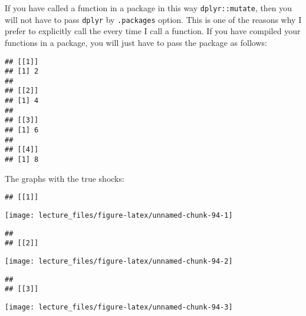 \documentclass[
]{book}
\newenvironment{Shaded}{\begin{snugshade}}{\end{snugshade}}
\newcommand{\CommentTok}[1]{\textcolor[rgb]{0.56,0.35,0.01}{\textit{#1}}}
\newcommand{\DataTypeTok}[1]{\textcolor[rgb]{0.13,0.29,0.53}{#1}}
\newcommand{\DecValTok}[1]{\textcolor[rgb]{0.00,0.00,0.81}{#1}}
\newcommand{\KeywordTok}[1]{\textcolor[rgb]{0.13,0.29,0.53}{\textbf{#1}}}
\newcommand{\NormalTok}[1]{#1}
\newcommand{\OperatorTok}[1]{\textcolor[rgb]{0.81,0.36,0.00}{\textbf{#1}}}
\newcommand{\StringTok}[1]{\textcolor[rgb]{0.31,0.60,0.02}{#1}}
\begin{document}
If you have called a function in a package in this way \texttt{dplyr::mutate}, then you will not have to pass \texttt{dplyr} by \texttt{.packages} option. This is one of the reasons why I prefer to explicitly call the every time I call a function. If you have compiled your functions in a package, you will just have to pass the package as follows:

\begin{Shaded}
\end{Shaded}

\begin{verbatim}
## [[1]]
## [1] 2
## 
## [[2]]
## [1] 4
## 
## [[3]]
## [1] 6
## 
## [[4]]
## [1] 8
\end{verbatim}

The graphs with the true shocks:

\begin{verbatim}
## [[1]]
\end{verbatim}

\begin{center}\texttt{[image: lecture\_files/figure-latex/unnamed-chunk-94-1]} \end{center}

\begin{verbatim}
## 
## [[2]]
\end{verbatim}

\begin{center}\texttt{[image: lecture\_files/figure-latex/unnamed-chunk-94-2]} \end{center}

\begin{verbatim}
## 
## [[3]]
\end{verbatim}

\begin{center}\texttt{[image: lecture\_files/figure-latex/unnamed-chunk-94-3]} \end{center}
\end{document}
